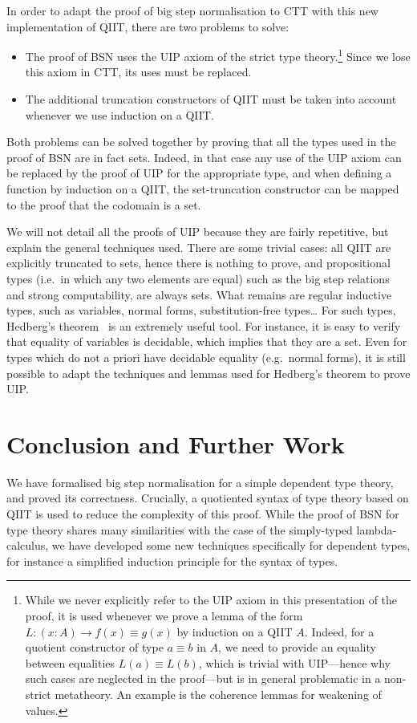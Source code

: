 \documentclass[a4paper,UKenglish,cleveref]{lipics-v2019}
\begin{document}
In order to adapt the proof of big step normalisation to CTT with this new
implementation of QIIT, there are two problems to solve:
\begin{itemize}
\item The proof of BSN uses the UIP axiom of the strict type theory.\footnote{%
    While we never explicitly refer to the UIP axiom in this presentation of the
    proof, it is used whenever we prove a lemma of the form
    $L : (x : A) \to f(x) \equiv g(x)$ by induction on a QIIT $A$.
    Indeed, for a quotient constructor of type $a \equiv b$ in $A$, we need to
    provide an equality between equalities $L(a) \equiv L(b)$, which is trivial
    with UIP---hence why such cases are neglected in the proof---but is
    in general problematic in a non-strict metatheory.
    An example is the coherence lemmas for weakening of values.
  }
  Since we lose this axiom in CTT, its uses must be replaced.
\item The additional truncation constructors of QIIT must be taken into account
  whenever we use induction on a QIIT.
\end{itemize}
Both problems can be solved together by proving that all the types used in the
proof of BSN are in fact sets. Indeed, in that case any use of the UIP axiom
can be replaced by the proof of UIP for the appropriate type, and when defining
a function by induction on a QIIT, the set-truncation constructor can be mapped
to the proof that the codomain is a set.

We will not detail all the proofs of UIP because they are fairly repetitive, but
explain the general techniques used. There are some trivial cases: all QIIT are
explicitly truncated to sets, hence there is nothing to prove, and propositional
types (i.e.\ in which any two elements are equal) such as the big step
relations and strong computability, are always sets. What remains are regular
inductive types, such as variables, normal forms, substitution-free types\dots{}
For such types, Hedberg's theorem~\cite{hedberg1998coherence} is an extremely
useful tool. For instance, it is easy to verify that equality of variables is
decidable, which implies that they are a set. Even for types which do not a
priori have decidable equality (e.g.\ normal forms), it is still possible to
adapt the techniques and lemmas used for Hedberg's theorem to prove UIP.

\section{Conclusion and Further Work}
We have formalised big step normalisation for a simple dependent type theory,
and proved its correctness. Crucially, a quotiented syntax of type theory based
on QIIT is used to reduce the complexity of this proof. While the proof of BSN
for type theory shares many similarities with the case of the simply-typed
lambda-calculus, we have developed some new techniques specifically for
dependent types, for instance a simplified induction principle for the syntax
of types.
\end{document}
